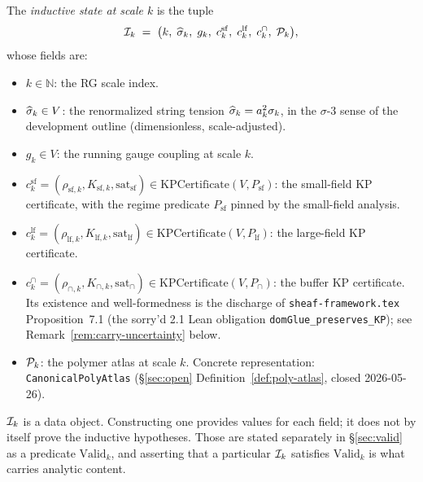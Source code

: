 \begin{definition}
\label{def:I-k}
The \emph{inductive state at scale $k$} is the tuple
\begin{equation}
  \label{eq:I-k}
  \mathcal{I}_k \;=\; \bigl( k, \;\widehat{\sigma}_k, \;g_k, \;c^{\mathrm{sf}}_k, \;c^{\mathrm{lf}}_k, \;c^{\cap}_k, \;\mathcal{P}_k \bigr),
\end{equation}
whose fields are:
\begin{itemize}
  \item $k \in \mathbb{N}$: the RG scale index.
  \item $\widehat{\sigma}_k \in V$: the renormalized string tension $\widehat{\sigma}_k = a_k^2 \sigma_k$, in the $\sigma$-$3$ sense of the development outline (dimensionless, scale-adjusted).
  \item $g_k \in V$: the running gauge coupling at scale $k$.
  \item $c^{\mathrm{sf}}_k = (\rho_{\mathrm{sf}, k}, K_{\mathrm{sf}, k}, \mathrm{sat}_{\mathrm{sf}}) \in \mathrm{KPCertificate}(V, P_{\mathrm{sf}})$: the small-field KP certificate, with the regime predicate $P_{\mathrm{sf}}$ pinned by the small-field analysis.
  \item $c^{\mathrm{lf}}_k = (\rho_{\mathrm{lf}, k}, K_{\mathrm{lf}, k}, \mathrm{sat}_{\mathrm{lf}}) \in \mathrm{KPCertificate}(V, P_{\mathrm{lf}})$: the large-field KP certificate.
  \item $c^{\cap}_k = (\rho_{\cap, k}, K_{\cap, k}, \mathrm{sat}_{\cap}) \in \mathrm{KPCertificate}(V, P_{\cap})$: the buffer KP certificate.  Its existence and well-formedness is the discharge of \texttt{sheaf-framework.tex} Proposition~7.1 (the sorry'd 2.1 Lean obligation \texttt{domGlue\_preserves\_KP}); see Remark~\ref{rem:carry-uncertainty} below.
  \item $\mathcal{P}_k$: the polymer atlas at scale $k$.  Concrete representation: \texttt{CanonicalPolyAtlas} (\S\ref{sec:open} Definition~\ref{def:poly-atlas}, closed 2026-05-26).
\end{itemize}
\end{definition}

\begin{remark}
$\mathcal{I}_k$ is a data object.  Constructing one provides values for each field; it does not by itself prove the inductive hypotheses.  Those are stated separately in \S\ref{sec:valid} as a predicate $\mathrm{Valid}_k$, and asserting that a particular $\mathcal{I}_k$ satisfies $\mathrm{Valid}_k$ is what carries analytic content.
\end{remark}

